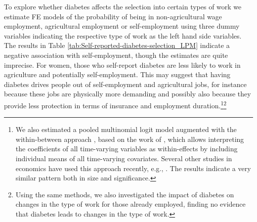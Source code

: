To explore whether diabetes affects the selection into certain types of work we estimate \ac{FE} models of the probability of being in non-agricultural wage employment, agricultural employment or self-employment using three dummy variables indicating the respective type of work as the left hand side variables. The results in Table \ref{tab:Self-reported-diabetes-selection_LPM} indicate a negative association with self-employment, though the estimates are quite imprecise. For women, those who self-report diabetes are less likely to work in agriculture and potentially self-employment. This may suggest that having diabetes drives people out of self-employment and agricultural jobs, for instance because these jobs are physically more demanding and possibly also because they provide less protection in terms of insurance and employment duration.\footnote{We also estimated a pooled multinomial logit model augmented  with the within-between approach \parencite{Bell2015}, based on the work of \textcite{Mundlak1978}, which allows interpreting the coefficients of all time-varying variables as within-effects by including individual means of all time-varying covariates. Several other studies in economics have used this approach recently, e.g., \textcite{Geishecker2011,Wunder2014,Boll2016}. The results indicate a very similar pattern both in size and significance.}\footnote{Using the same methods, we also investigated the impact of diabetes on changes in the type of work for those already employed, finding no evidence that diabetes leads to changes in the type of work.}


